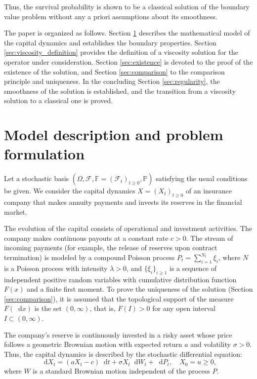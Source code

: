\documentclass[smallextended]{svjour3}
\providecommand{\diff}{\mathop{}\!\mathrm{d}}
\begin{document}
Thus, the survival probability is shown to be a classical solution of the boundary value problem without any a priori assumptions about its smoothness.

The paper is organized as follows. Section \ref{sec:model} describes the mathematical model of the capital dynamics and establishes the boundary properties. Section \ref{sec:viscosity_definition} provides the definition of a viscosity solution for the operator under consideration. Section \ref{sec:existence} is devoted to the proof of the existence of the solution, and Section \ref{sec:comparison} to the comparison principle and uniqueness. In the concluding Section \ref{sec:regularity}, the smoothness of the solution is established, and the transition from a viscosity solution to a classical one is proved.


\section{Model description and problem formulation}
\label{sec:model}

Let a stochastic basis $(\Omega, \mathcal{F}, \mathbb{F}=(\mathcal{F}_t)_{t \ge 0}, \mathbb{P})$ satisfying the usual conditions be given. We consider the capital dynamics $X = (X_t)_{t \ge 0}$ of an insurance company that makes annuity payments and invests its reserves in the financial market.

The evolution of the capital consists of operational and investment activities. The company makes continuous payouts at a constant rate $c > 0$. The stream of incoming payments (for example, the release of reserves upon contract termination) is modeled by a compound Poisson process $P_t = \sum_{i=1}^{N_t} \xi_i$, where $N$ is a Poisson process with intensity $\lambda > 0$, and $\{\xi_i\}_{i \ge 1}$ is a sequence of independent positive random variables with cumulative distribution function $F(x)$ and a finite first moment. To prove the uniqueness of the solution (Section \ref{sec:comparison}), it is assumed that the topological support of the measure $F(\diff x)$ is the set $(0, \infty)$, that is, $F(I) > 0$ for any open interval $I \subset (0, \infty)$.

The company's reserve is continuously invested in a risky asset whose price follows a geometric Brownian motion with expected return $a$ and volatility $\sigma > 0$. Thus, the capital dynamics is described by the stochastic differential equation:
\begin{equation*}
\diff X_t = (a X_t - c)\diff t + \sigma X_t \diff W_t + \diff P_t, \quad X_0 = u \ge 0,
\end{equation*}
where $W$ is a standard Brownian motion independent of the process $P$.
\end{document}
